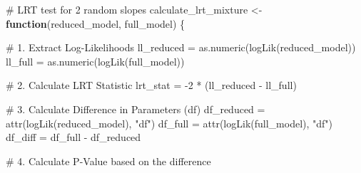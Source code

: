\documentclass[
  12pt,
]{article}
\newenvironment{Shaded}{\begin{snugshade}}{\end{snugshade}}
\newcommand{\CommentTok}[1]{\textcolor[rgb]{0.37,0.37,0.37}{#1}}
\newcommand{\ControlFlowTok}[1]{\textcolor[rgb]{0.00,0.23,0.31}{\textbf{#1}}}
\newcommand{\DecValTok}[1]{\textcolor[rgb]{0.68,0.00,0.00}{#1}}
\newcommand{\FunctionTok}[1]{\textcolor[rgb]{0.28,0.35,0.67}{#1}}
\newcommand{\NormalTok}[1]{\textcolor[rgb]{0.00,0.23,0.31}{#1}}
\newcommand{\OtherTok}[1]{\textcolor[rgb]{0.00,0.23,0.31}{#1}}
\newcommand{\SpecialCharTok}[1]{\textcolor[rgb]{0.37,0.37,0.37}{#1}}
\newcommand{\StringTok}[1]{\textcolor[rgb]{0.13,0.47,0.30}{#1}}
\begin{document}
\begin{Shaded}
\begin{Highlighting}[]
\CommentTok{\# LRT test for 2 random slopes}
\NormalTok{calculate\_lrt\_mixture }\OtherTok{\textless{}{-}} \ControlFlowTok{function}\NormalTok{(reduced\_model, full\_model) \{}
  
  \CommentTok{\# 1. Extract Log{-}Likelihoods}
\NormalTok{  ll\_reduced }\OtherTok{=} \FunctionTok{as.numeric}\NormalTok{(}\FunctionTok{logLik}\NormalTok{(reduced\_model))}
\NormalTok{  ll\_full }\OtherTok{=} \FunctionTok{as.numeric}\NormalTok{(}\FunctionTok{logLik}\NormalTok{(full\_model))}
  
  \CommentTok{\# 2. Calculate LRT Statistic}
\NormalTok{  lrt\_stat }\OtherTok{=} \SpecialCharTok{{-}}\DecValTok{2} \SpecialCharTok{*}\NormalTok{ (ll\_reduced }\SpecialCharTok{{-}}\NormalTok{ ll\_full)}
  
  \CommentTok{\# 3. Calculate Difference in Parameters (df)}
\NormalTok{  df\_reduced }\OtherTok{=} \FunctionTok{attr}\NormalTok{(}\FunctionTok{logLik}\NormalTok{(reduced\_model), }\StringTok{"df"}\NormalTok{)}
\NormalTok{  df\_full }\OtherTok{=} \FunctionTok{attr}\NormalTok{(}\FunctionTok{logLik}\NormalTok{(full\_model), }\StringTok{"df"}\NormalTok{)}
\NormalTok{  df\_diff }\OtherTok{=}\NormalTok{ df\_full }\SpecialCharTok{{-}}\NormalTok{ df\_reduced}
  
  \CommentTok{\# 4. Calculate P{-}Value based on the difference}
  

\end{Highlighting}
\end{Shaded}
\end{document}
